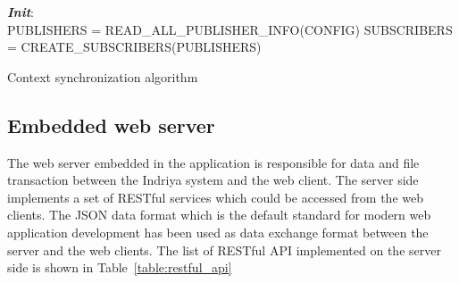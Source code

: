 \begin{algorithm}[H]
 \textbf{\emph{Init}}:\\
 \quad PUBLISHERS = READ\_ALL\_PUBLISHER\_INFO(CONFIG)\;
 \quad SUBSCRIBERS = CREATE\_SUBSCRIBERS(PUBLISHERS)\;
 \caption{Context synchronization algorithm}
 \label{alg:context_sync}
\end{algorithm}
\subsection*{Embedded web server}
The web server embedded in the application is responsible for data and file transaction between the Indriya system and the web client. The server side implements a set of RESTful services \cite{RESTFul} which could be accessed from the web clients. The JSON data format which is the default standard for modern web application development has been used as data exchange format between the server and the web clients. The list of RESTful API implemented on the server side is shown in Table~\ref{table:restful_api}

